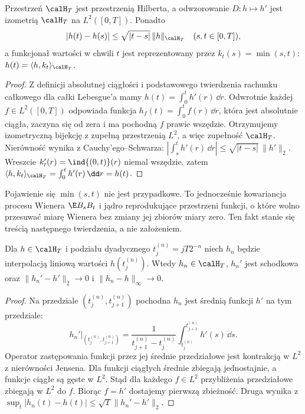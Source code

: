 \begin{twierdzenie}
\label{th:cm-hilbert}
Przestrzeń $\calH_T$ jest przestrzenią Hilberta,
a odwzorowanie $D:h\mapsto h'$ jest izometrią
$\calH_T$ na $L^2([0,T])$. Ponadto
\[
|h(t)-h(s)|\le\sqrt{|t-s|}\,\|h\|_{\calH_T}
\quad(s,t\in[0,T]),
\]
a funkcjonał wartości w chwili $t$ jest reprezentowany
przez $k_t(s)=\min(s,t)$:
$h(t)=\langle h,k_t\rangle_{\calH_T}$.
\end{twierdzenie}
\begin{proof}
Z definicji absolutnej ciągłości i podstawowego twierdzenia
rachunku całkowego dla całki Lebesgue'a mamy
$h(t)=\int_0^t h'(r)\,\dd r$. Odwrotnie każdej
$f\in L^2([0,T])$ odpowiada funkcja
$h_f(t)=\int_0^t f(r)\,\dd r$, która jest absolutnie
ciągła, zaczyna się od zera i ma pochodną $f$ prawie
wszędzie. Otrzymujemy izometryczną bijekcję z zupełną
przestrzenią $L^2$, a więc zupełność $\calH_T$.
Nierówność wynika z Cauchy'ego--Schwarza:
$|\int_s^t h'(r)\,\dd r|\le\sqrt{|t-s|}\,\|h'\|_2$.
Wreszcie $k_t'(r)=\ind{(0,t)}(r)$ niemal wszędzie, zatem
$\langle h,k_t\rangle_{\calH_T}=\int_0^t h'(r)\,\dd r=h(t)$.
\end{proof}

Pojawienie się $\min(s,t)$ nie jest przypadkowe. To jednocześnie
kowariancja procesu Wienera $\E B_sB_t$ i jądro reprodukujące
przestrzeni funkcji, o które wolno przesuwać miarę Wienera
bez zmiany jej zbiorów miary zero. Ten fakt stanie się treścią
następnego twierdzenia, a nie założeniem.

\begin{lemat}
\label{lem:cm-approx}
Dla $h\in\calH_T$ i podziału dyadycznego
$t_j^{(n)}=jT2^{-n}$ niech $h_n$ będzie interpolacją liniową
wartości $h(t_j^{(n)})$. Wtedy $h_n\in\calH_T$,
$h_n'$ jest schodkowa oraz
$\|h_n'-h'\|_2\to0$ i $\|h_n-h\|_\infty\to0$.
\end{lemat}
\begin{proof}
Na przedziale $(t_j^{(n)},t_{j+1}^{(n)})$ pochodna $h_n$
jest średnią funkcji $h'$ na tym przedziale:
\[
 h_n'|_{(t_j^{(n)},t_{j+1}^{(n)})}
 =\frac{1}{t_{j+1}^{(n)}-t_j^{(n)}}
 \int_{t_j^{(n)}}^{t_{j+1}^{(n)}}h'(s)\,\dd s.
\]
Operator zastępowania funkcji przez jej średnie przedziałowe
jest kontrakcją w $L^2$ z nierówności Jensena.
Dla funkcji ciągłych średnie zbiegają jednostajnie,
a funkcje ciągłe są gęste w $L^2$. Stąd dla każdego
$f\in L^2$ przybliżenia przedziałowe zbiegają w $L^2$ do $f$.
Biorąc $f=h'$ dostajemy pierwszą zbieżność. Druga wynika
z $\sup_t|h_n(t)-h(t)|\le\sqrt T\|h_n'-h'\|_2$.
\end{proof}

